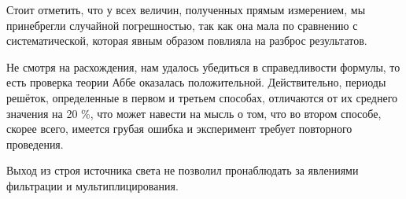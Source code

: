\documentclass[a4paper, 12pt]{article}%
\begin{document}
	Стоит отметить, что у всех величин, полученных прямым измерением, мы принебрегли случайной погрешностью, так как она мала по сравнению с систематической, которая явным образом повлияла на разброс результатов.
	
	Не смотря на расхождения, нам удалось убедиться в справедливости формулы, то есть проверка теории Аббе оказалась положительной. Действительно, периоды решёток, определенные в первом и третьем способах, отличаются от их среднего значения на 20 \%, что может навести на мысль о том, что во втором способе, скорее всего, имеется грубая ошибка и эксперимент требует повторного проведения.
	
	Выход из строя источника света не позволил пронаблюдать за явлениями фильтрации и мультиплицирования.
\end{document}
